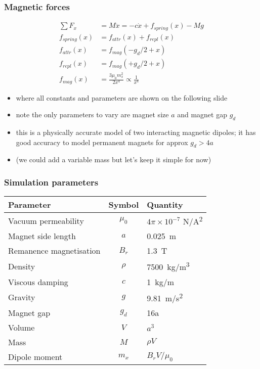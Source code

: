 \documentclass[9pt]{beamer-control}
\begin{document}
\begin{frame}
\frametitle{Magnetic forces}

\begin{align}
\sum F_x &= M\ddot x = - c\dot x + f_{spring}(x) - Mg\\
f_{spring}(x)  &= f_{attr}(x) + f_{repl}(x) \\
f_{attr}(x) &= f_{mag}(-g_d/2+x) \\
f_{repl}(x) &= f_{mag}(+g_d/2+x) \\
f_{mag}(x)  &= \frac{3 \mu_0 m_x^2}{2 x^4} \propto \frac{1}{x^4}
\end{align}
\begin{itemize}
\item where all constants and parameters are shown on the following slide
\item note the only parameters to vary are magnet size $a$ and magnet gap $g_d$
\item this is a physically accurate model of two interacting magnetic dipoles; it has good accuracy to model permanent magnets for approx $g_d>4a$
\item (we could add a variable mass but let's keep it simple for now)
\end{itemize}

\end{frame}

\begin{frame}
\frametitle{Simulation parameters}

\begin{tabular}{lcl}
\toprule
Parameter & Symbol & Quantity \\
\midrule
Vacuum permeability & $\mu_0$ & $4\pi\times10^{-7}$ \si{N/A^2} \\
Magnet side length & $a$ & \qty{0.025}{m} \\
Remanence magnetisation & $B_r$ & \qty{1.3}{T} \\
Density & $\rho$ & \qty{7500}{kg/m^3} \\
Viscous damping & $c$ & \qty{1}{kg/m} \\
Gravity & $g$ & \qty{9.81}{m/s^2} \\
\midrule
Magnet gap & $g_d$ & 16a \\
\midrule
Volume & $V$ & $a^3$ \\
Mass & $M$ & $\rho V$ \\
Dipole moment & $m_x$ & $B_r V/\mu_0$\\
\bottomrule
\end{tabular}

\end{frame}
\end{document}
